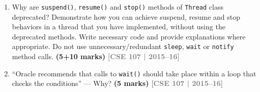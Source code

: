 \documentclass[12pt,a3paper]{article}
\newcommand{\yr}[1]{\hfill\textcolor{gray}{\small\textbf{[#1]}}}
\newcommand{\mk}[1]{\textcolor{orange!70!black}{\small\textbf{(#1 marks)}}}
\begin{document}
\begin{enumerate}
Write a Java program to implement the above simulator. You have to run each vehicle
as a thread. Please make your own assumption to build the whole scenario as realistic as
possible to reflect the real-world scenario. \mk{35}
\yr{CSE 201 | 2015--16}




\item Why are \texttt{suspend()}, \texttt{resume()} and \texttt{stop()} methods of \texttt{Thread} class deprecated? Demonstrate how you can achieve suspend, resume and stop behaviors in a thread that you have implemented, without using the deprecated methods. Write necessary code and provide explanations where appropriate. Do not use unnecessary/redundant \texttt{sleep}, \texttt{wait} or \texttt{notify} method calls. \mk{5+10}
\yr{CSE 107 | 2015--16}




\item ``Oracle recommends that calls to \texttt{wait()} should take place within a loop that checks the conditions'' --- Why? \mk{5}
\yr{CSE 107 | 2015--16}





\end{enumerate}
\end{document}
